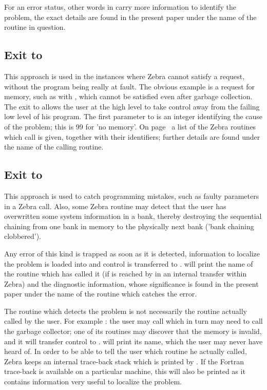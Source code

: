 For an error status, other words in  carry more
information to identify the problem,
the exact details are found in the present paper
under the name of the routine in question.

\subsection*{Exit to }

    This approach is used in the instances where Zebra cannot
satisfy a request, without the program being really at fault.
The obvious example is a request for memory, such as with ,
which cannot be satisfied even after garbage collection.
The exit to  allows the user at the high level to take
control away from the failing low level of his program.
The first parameter to  is an integer identifying the
cause of the problem; this  is 99 for 'no memory'.
On page~\pageref{sec:diaztell} a list of
the Zebra routines which call  is given,
together with their identifiers;
further details are found under the name of the calling routine.

\subsection*{Exit to }

    This approach is used to catch programming mistakes,
such as faulty parameters in a Zebra call.
Also, some Zebra routine may detect that the user has overwritten
some system information in a bank,
thereby destroying the sequential chaining from one bank in
memory to the physically next bank
('bank chaining clobbered').

    Any error of this kind is trapped as soon as it is detected,
information to localize the problem is loaded into
 and control is transferred to .
 will print the name of the routine which has called it
(if  is reached by in an internal transfer within Zebra)
and the diagnostic information,
whose significance is found in the present paper under
the name of the routine which catches the error.

    The routine which detects the problem is not necessarily the
routine actually called by the user.
For example : the user may call  which in turn may need to
call the garbage collector;
one of its routines may discover that the memory is invalid,
and it will transfer control to .
 will print its name, which the user may never have
heard of.
In order to be able to tell the user which routine he
actually called,
Zebra keeps an internal trace-back stack which is printed by .
If the Fortran trace-back is available on a particular
machine, this will also be printed as it contains information
very useful to localize the problem.


